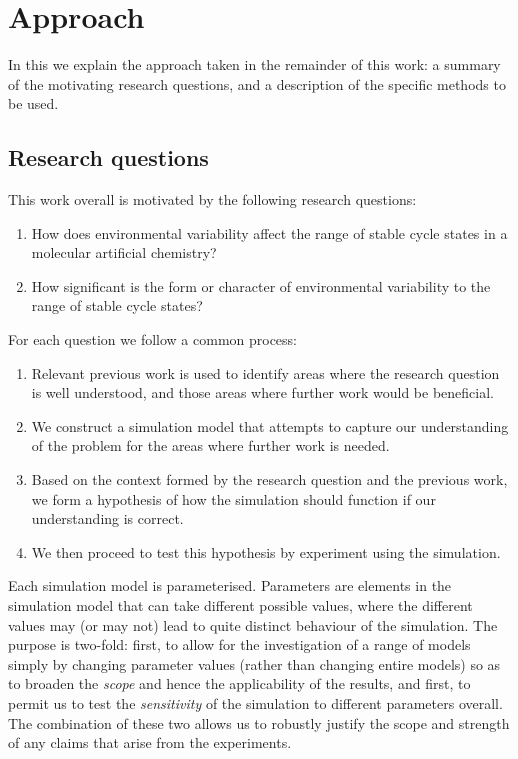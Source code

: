 \section{Approach}\label{methods}

In this  we explain the approach taken in the remainder of this work: a summary of the motivating research questions, and a description of the specific methods to be used.

\subsection{Research questions}\label{research-questions}

This work overall is motivated by the following research questions:

\vspace{0.3cm}
\begin{minipage}[l]{0.95\textwidth}
	\begin{enumerate}[label=RQ\arabic*:]
		\item How does environmental variability affect the range of stable cycle states in a molecular artificial chemistry?
		\item How significant is the form or character of environmental variability to the range of stable cycle states?
	\end{enumerate}
\end{minipage}
\vspace{0.3cm}

For each question we follow a common process:
\begin{enumerate}
	\item Relevant previous work is used to identify areas where the research question is well understood, and those areas where further work would be beneficial.
	\item We construct a simulation model that attempts to capture our understanding of the problem for the areas where further work is needed.
	\item Based on the context formed by the research question and the previous work, we form a hypothesis of how the simulation should function if our understanding is correct.
	\item We then proceed to test this hypothesis by experiment using the simulation.
\end{enumerate}

Each simulation model is parameterised. Parameters are elements in the simulation model that can take different possible values, where the different values may (or may not) lead to quite distinct behaviour of the simulation. The purpose is two-fold: first, to allow for the investigation of a range of models simply by changing parameter values (rather than changing entire models) so as to broaden the \emph{scope} and hence the applicability of the results, and first, to permit us to test the \emph{sensitivity} of the simulation to different parameters overall. The combination of these two allows us to robustly justify the scope and strength of any claims that arise from the experiments.

